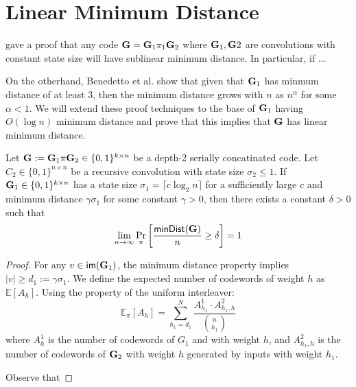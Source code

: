 \section{Linear Minimum Distance}

\cite{spielman} gave a proof that any code $\mathbf{G} = \mathbf{G}_1\pi_1\mathbf{G}_2$ where $\mathbf{G}_1,\mathbf{G}2$ are convolutions with constant state size will have sublinear minimum distance. In particular, if ...

 On the otherhand, Benedetto et al. \cite{benedetto2002serial} show that given that $\mathbf{G}_1$ has minmum distance of at least 3, then the minimum distance grows with $n$ as $n^\alpha$ for some $\alpha<1$. We will extend these proof techniques to the base of $\mathbf{G}_1$ having $O(\log n)$ minimum distance and prove that this implies that $\mathbf{G}$ has linear minimum distance. 

 \begin{theorem}
    Let $\mathbf{G}:=\mathbf{G}_1\pi\mathbf{G}_2\in \{0,1\}^{k\times n}$ be a depth-2 serially concatinated code. Let $C_2\in \{0,1\}^{n\times n}$ be a recursive convolution with state size $\sigma_2\leq 1.$ If $\mathbf{G}_1\in\{0,1\}^{k\times n}$ has a state size $\sigma_1=\lceil c\log_2 n\rceil$ for a sufficiently large $c$ and minimum distance $\gamma \sigma_1$ for some constant $\gamma> 0$, then there exists a constant $\delta>0$ such that 
    $$
       \lim_{n\rightarrow\infty} \Pr_{\pi}\left[\frac{\mathsf{minDist}(\mathbf{G})}{n}\geq \delta\right] = 1
    $$
 \end{theorem}
 \begin{proof}
    For any $v\in \mathsf{im}(\mathbf{G}_1)$, the minimum distance property implies $|v|\geq d_1:=\gamma\sigma_1$.
    We define the expected number of codewords of weight $h$ as $\mathbb{E}[A_h]$. Using the property of the uniform interleaver:
    $$
    \mathbb{E}_{\pi}[A_h] = \sum_{h_1=d_1}^N \frac{A_{h_1}^1 \cdot A_{h_1,h}^2}{\binom{n}{h_1}}
    $$
    where $A^1_h$ is the number of codewords of $G_1$ and with weight $h$, and $A_{h_1,h}^2$ is the number of codewords of $\mathbf{G}_2$ with weight $h$ generated by inputs with weight $h_1$.

    Observe that 
 \end{proof}
